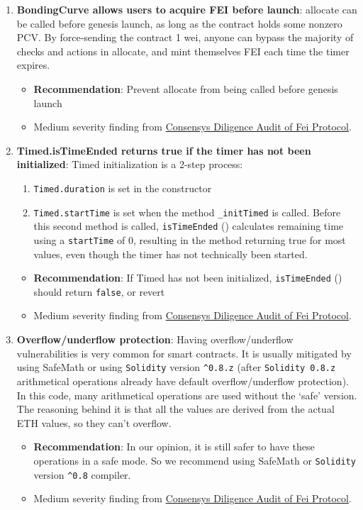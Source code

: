 \begin{enumerate}
\item\textbf{BondingCurve allows users to acquire FEI before launch}: allocate can be called before genesis launch, as long as the contract holds some nonzero PCV. By force-sending the contract 1 wei, anyone can bypass the majority of checks and actions in allocate, and mint themselves FEI each time the timer expires.
	\begin{itemize}
	\item\textbf{Recommendation}: Prevent allocate from being called before genesis launch
	\item Medium severity finding from \href{https://consensys.net/diligence/audits/2021/01/fei-protocol/\#bondingcurve-allows-users-to-acquire-fei-before-launch}{Consensys Diligence Audit of Fei Protocol}.
	\end{itemize}

\item\textbf{Timed.isTimeEnded returns true if the timer has not been initialized}: Timed initialization is a 2-step process:
    \begin{enumerate}
    \item\verb|Timed.duration| is set in the constructor
    \item\verb|Timed.startTime| is set when the method \verb|_initTimed| is called. Before this second method is called, \verb|isTimeEnded| () calculates remaining time using a \verb|startTime|  of 0, resulting in the method returning true for most values, even though the timer has not technically been started.
    \end{enumerate}
	\begin{itemize}
	\item\textbf{Recommendation}: If Timed has not been initialized, \verb|isTimeEnded| () should return \verb|false|, or revert
	\item Medium severity finding from \href{https://consensys.net/diligence/audits/2021/01/fei-protocol/\#timed-istimeended-returns-true-if-the-timer-has-not-been-initialized}{Consensys Diligence Audit of Fei Protocol}.
	\end{itemize}

\item\textbf{Overflow/underflow protection}: Having overflow/underflow vulnerabilities is very common for smart contracts. It is usually mitigated by using SafeMath or using \verb|Solidity| version \verb|^0.8.z| (after \verb|Solidity 0.8.z| arithmetical operations already have default overflow/underflow protection). In this code, many arithmetical operations are used without the ‘safe’ version. The reasoning behind it is that all the values are derived from the actual ETH values, so they can’t overflow.
	\begin{itemize}
	\item\textbf{Recommendation}: In our opinion, it is still safer to have these operations in a safe mode. So we recommend using SafeMath or \verb|Solidity| version \verb|^0.8| compiler.
	\item Medium severity finding from \href{https://consensys.net/diligence/audits/2021/01/fei-protocol/\#overflow-underflow-protection}{Consensys Diligence Audit of Fei Protocol}.
	\end{itemize}


\end{enumerate}
